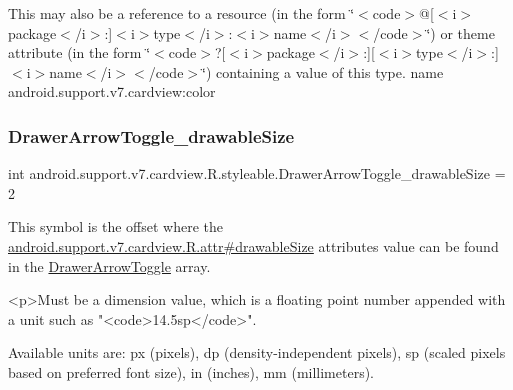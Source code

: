 This may also be a reference to a resource (in the form \char`\"{}$<$code$>$@\mbox{[}$<$i$>$package$<$/i$>$\+:\mbox{]}$<$i$>$type$<$/i$>$\+:$<$i$>$name$<$/i$>$$<$/code$>$\char`\"{}) or theme attribute (in the form \char`\"{}$<$code$>$?\mbox{[}$<$i$>$package$<$/i$>$\+:\mbox{]}\mbox{[}$<$i$>$type$<$/i$>$\+:\mbox{]}$<$i$>$name$<$/i$>$$<$/code$>$\char`\"{}) containing a value of this type.  name android.\+support.\+v7.\+cardview\+:color \mbox{\label{classandroid_1_1support_1_1v7_1_1cardview_1_1R_1_1styleable_a6d4ecae9e68c499196ff3d66052769ef}} 
\subsubsection{\texorpdfstring{Drawer\+Arrow\+Toggle\+\_\+drawable\+Size}{DrawerArrowToggle\_drawableSize}}
{\footnotesize\ttfamily int android.\+support.\+v7.\+cardview.\+R.\+styleable.\+Drawer\+Arrow\+Toggle\+\_\+drawable\+Size = 2\hspace{0.3cm}{\ttfamily [static]}}

This symbol is the offset where the \hyperlink{classandroid_1_1support_1_1v7_1_1cardview_1_1R_1_1attr_a1156b8c69ce20341c6ffdec0e8f148f6}{android.\+support.\+v7.\+cardview.\+R.\+attr\#drawable\+Size} attribute\textquotesingle{}s value can be found in the \hyperlink{classandroid_1_1support_1_1v7_1_1cardview_1_1R_1_1styleable_a159ca17c520d2f2d93f6152d01b0b8df}{Drawer\+Arrow\+Toggle} array.

\begin{DoxyVerb}      <p>Must be a dimension value, which is a floating point number appended with a unit such as "<code>14.5sp</code>".
\end{DoxyVerb}
 Available units are\+: px (pixels), dp (density-\/independent pixels), sp (scaled pixels based on preferred font size), in (inches), mm (millimeters). 

